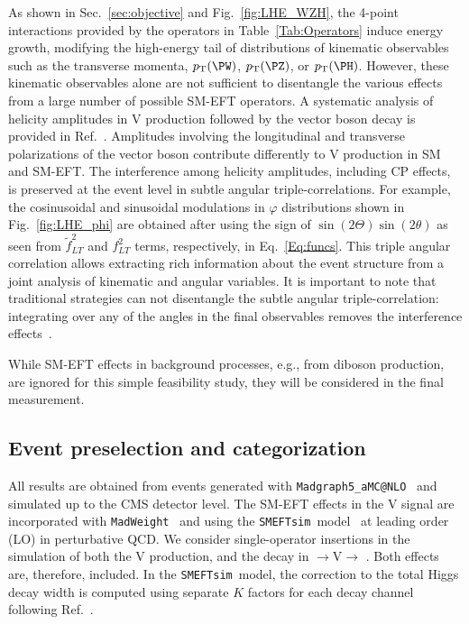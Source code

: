\documentclass[a4paper,11pt]{article}
\newcommand{\Pb}{{{\Pqb}}\xspace}
\newcommand{\PAb}{{{{\Paqb}}}\xspace}
\renewcommand{\PV}{{{{V}}}\xspace}
\newcommand{\VH}{{{\PV}{\PH}}\xspace}
\newcommand{\pp}{{{\Pp}{\Pp}}\xspace}
\newcommand{\lplp}{{{\Pl}{\Pl}}\xspace}
\begin{document}
As shown in Sec.~\ref{sec:objective} and Fig.~\ref{fig:LHE_WZH}, the 4-point interactions provided by the operators in Table~\ref{Tab:Operators} induce energy growth, modifying the high-energy tail of distributions of kinematic observables such as the transverse momenta, $\pt(\PW)$, $\pt(\PZ)$, or $\pt(\PH)$. 
However, these kinematic observables alone are not sufficient to disentangle the various effects from a large number of possible SM-EFT operators. 
A systematic analysis of helicity amplitudes in \VH production followed by the vector boson decay is provided in Ref.~\cite{Banerjee:2019twi}. 
Amplitudes involving the longitudinal and transverse polarizations of the vector boson contribute differently to \VH production in SM and SM-EFT. 
The interference among helicity amplitudes, including CP effects, is preserved at the event level in subtle angular triple-correlations. 
For example, the cosinusoidal and sinusoidal modulations in $\varphi$ distributions shown in Fig.~\ref{fig:LHE_phi} are obtained after using the sign of $\sin\left(2\Theta\right)\sin\left(2\theta\right)$ as seen from $\tilde{f}^2_{LT}$ and $f^2_{LT}$ terms, respectively, in  Eq.~\ref{Eq:funcs}. 
This triple angular correlation allows extracting rich information about the event structure from a joint analysis of kinematic and angular variables. 
It is important to note that traditional strategies can not disentangle the subtle angular triple-correlation: integrating over any of the angles in the final observables removes the interference effects~\cite{Panico:2017frx}.

While SM-EFT effects in background processes, e.g., from diboson production, are ignored for this simple feasibility study, they will be considered in the final measurement.

\subsection{Event preselection and categorization}

All results are obtained from events generated with \texttt{Madgraph5\_aMC@NLO}~\cite{Alwall:2014hca} and simulated up to the CMS detector level. 
The SM-EFT effects in the \VH signal are incorporated with \texttt{MadWeight}~\cite{Artoisenet:2008zz} and using the \texttt{SMEFTsim}~model~\cite{Brivio:2017btx,Brivio:2020onw} at leading order (LO) in perturbative QCD. 
We consider single-operator insertions in the simulation of both the \VH production, and the decay in {\pp$\rightarrow$\VH$\rightarrow$ \lplp \Pb\PAb}. Both effects are, therefore, included. In the \texttt{SMEFTsim}~model, the correction to the total Higgs decay width is computed using separate $K$ factors for each decay channel following Ref.~\cite{Brivio:2019myy}.
\end{document}
